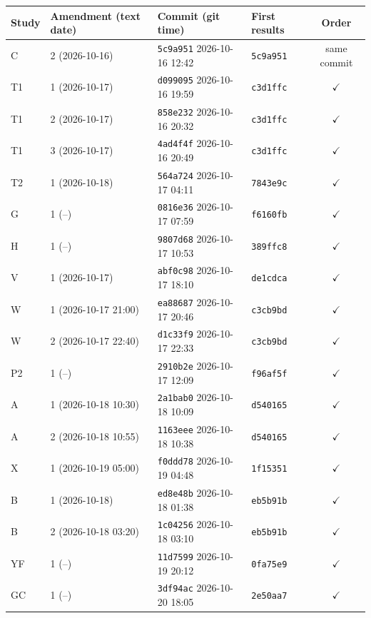 \begin{tabular}{llllc}
\toprule
Study & Amendment (text date) & Commit (git time) & First results & Order \\
\midrule
C & 2 (2026-10-16) & \texttt{5c9a951} 2026-10-16 12:42 & \texttt{5c9a951} & same commit \\
T1 & 1 (2026-10-17) & \texttt{d099095} 2026-10-16 19:59 & \texttt{c3d1ffc} & $\checkmark$ \\
T1 & 2 (2026-10-17) & \texttt{858e232} 2026-10-16 20:32 & \texttt{c3d1ffc} & $\checkmark$ \\
T1 & 3 (2026-10-17) & \texttt{4ad4f4f} 2026-10-16 20:49 & \texttt{c3d1ffc} & $\checkmark$ \\
T2 & 1 (2026-10-18) & \texttt{564a724} 2026-10-17 04:11 & \texttt{7843e9c} & $\checkmark$ \\
G & 1 (--) & \texttt{0816e36} 2026-10-17 07:59 & \texttt{f6160fb} & $\checkmark$ \\
H & 1 (--) & \texttt{9807d68} 2026-10-17 10:53 & \texttt{389ffc8} & $\checkmark$ \\
V & 1 (2026-10-17) & \texttt{abf0c98} 2026-10-17 18:10 & \texttt{de1cdca} & $\checkmark$ \\
W & 1 (2026-10-17 21:00) & \texttt{ea88687} 2026-10-17 20:46 & \texttt{c3cb9bd} & $\checkmark$ \\
W & 2 (2026-10-17 22:40) & \texttt{d1c33f9} 2026-10-17 22:33 & \texttt{c3cb9bd} & $\checkmark$ \\
P2 & 1 (--) & \texttt{2910b2e} 2026-10-17 12:09 & \texttt{f96af5f} & $\checkmark$ \\
A & 1 (2026-10-18 10:30) & \texttt{2a1bab0} 2026-10-18 10:09 & \texttt{d540165} & $\checkmark$ \\
A & 2 (2026-10-18 10:55) & \texttt{1163eee} 2026-10-18 10:38 & \texttt{d540165} & $\checkmark$ \\
X & 1 (2026-10-19 05:00) & \texttt{f0ddd78} 2026-10-19 04:48 & \texttt{1f15351} & $\checkmark$ \\
B & 1 (2026-10-18) & \texttt{ed8e48b} 2026-10-18 01:38 & \texttt{eb5b91b} & $\checkmark$ \\
B & 2 (2026-10-18 03:20) & \texttt{1c04256} 2026-10-18 03:10 & \texttt{eb5b91b} & $\checkmark$ \\
YF & 1 (--) & \texttt{11d7599} 2026-10-19 20:12 & \texttt{0fa75e9} & $\checkmark$ \\
GC & 1 (--) & \texttt{3df94ac} 2026-10-20 18:05 & \texttt{2e50aa7} & $\checkmark$ \\

\end{tabular}
